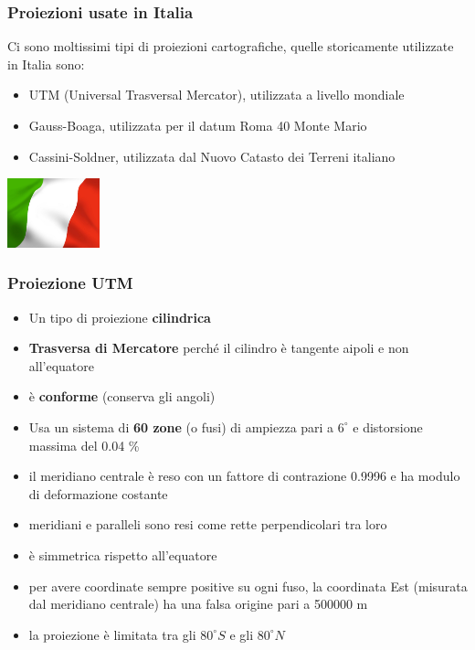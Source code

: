 \documentclass{beamer}
\begin{document}
{\begin{frame}
   \frametitle{Proiezioni usate in Italia}
Ci sono moltissimi tipi di proiezioni cartografiche, quelle storicamente utilizzate in Italia sono:
	\begin{itemize}
		\item UTM (Universal Trasversal Mercator), utilizzata a livello mondiale
		\item Gauss-Boaga, utilizzata per il datum Roma 40 Monte Mario 
		\item Cassini-Soldner, utilizzata dal Nuovo Catasto dei Terreni italiano 
	\end{itemize}
	\begin{center}
		\includegraphics[width=0.2\textwidth] {./pics/ita.jpg}
	\end{center}
\end{frame}

\begin{frame}
   \frametitle{Proiezione UTM}
	\small
	\begin{itemize}
		\item Un tipo di proiezione \textbf{cilindrica}
		\item \textbf{Trasversa di Mercatore} perché il cilindro è tangente aipoli e non all’equatore
		\item è \textbf{conforme} (conserva gli angoli)
		\item Usa un sistema di \textbf{60 zone} (o fusi) di ampiezza pari a $ 6^{\circ}$ e distorsione massima del 0.04 \%
		\item il meridiano centrale è reso con un fattore di contrazione 0.9996 e ha modulo di deformazione costante
		\item meridiani e paralleli sono resi come rette perpendicolari tra loro
		\item è simmetrica rispetto all’equatore
		\item per avere coordinate sempre positive su ogni fuso, la coordinata Est (misurata dal meridiano centrale) ha una falsa origine pari a
500000 m 
		\item la proiezione è limitata tra gli $ 80^{\circ} S $ e gli $ 80^{\circ} N $
	\end{itemize}
\end{frame}


}
\end{document}
